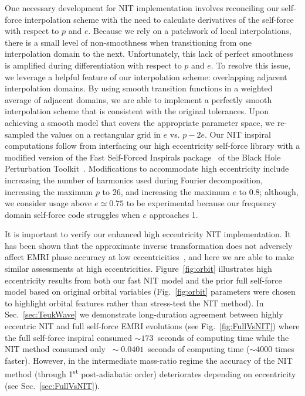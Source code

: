 \documentclass[aps,prd,twocolumn,showpacs,notitlepage,eqsecnum,
superscriptaddress,nofootinbib]{revtex4-1}
\begin{document}
One necessary development for NIT implementation involves reconciling our self-force interpolation scheme with the need to calculate derivatives of the self-force with respect to $p$ and $e$. Because we rely on a patchwork of local interpolations, there is a small level of non-smoothness when transitioning from one interpolation domain to the next. Unfortunately, this lack of perfect smoothness is amplified during differentiation with respect to $p$ and $e$. To resolve this issue, we leverage a helpful feature of our interpolation scheme: overlapping adjacent interpolation domains. By using smooth transition functions in a weighted average of adjacent domains, we are able to implement a perfectly smooth interpolation scheme that is consistent with the original tolerances. Upon achieving a smooth model that covers the appropriate parameter space, we re-sampled the values on a rectangular grid in $e$ vs. $p-2e$. Our NIT inspiral computations follow from interfacing our high eccentricity self-force library with a modified version of the Fast Self-Forced Inspirals package~\cite{VandWarb18} of the Black Hole Perturbation Toolkit~\cite{toolkit}. Modifications to accommodate high eccentricity include increasing the number of harmonics used during Fourier decomposition, increasing the maximum $p$ to 26, and increasing the maximum $e$ to 0.8; although, we consider usage above $e\simeq 0.75$ to be experimental because our frequency domain self-force code struggles when $e$ approaches 1.

It is important to verify our enhanced high eccentricity NIT implementation. It has been shown that the approximate inverse transformation does not adversely affect EMRI phase accuracy at low eccentricities~\cite{VandWarb18}, and here we are able to make similar assessments at high eccentricities. Figure~\ref{fig:orbit} illustrates high eccentricity results from both our fast NIT model and the prior full self-force model based on original orbital variables (Fig.~\ref{fig:orbit} parameters were chosen to highlight orbital features rather than stress-test the NIT method). In Sec.~\ref{sec:TeukWave} we demonstrate long-duration agreement between highly eccentric NIT and full self-force EMRI evolutions (see Fig.~\ref{fig:FullVsNIT}) where the full self-force inspiral consumed $\sim 173$~seconds of computing time while the NIT method consumed only $~\sim 0.0401$~seconds of computing time ($\sim 4000$ times faster). However, in the intermediate mass-ratio regime the accuracy of the NIT method (through 1\textsuperscript{st} post-adiabatic order) deteriorates depending on eccentricity (see Sec.~\ref{sec:FullVsNIT}).
\end{document}
